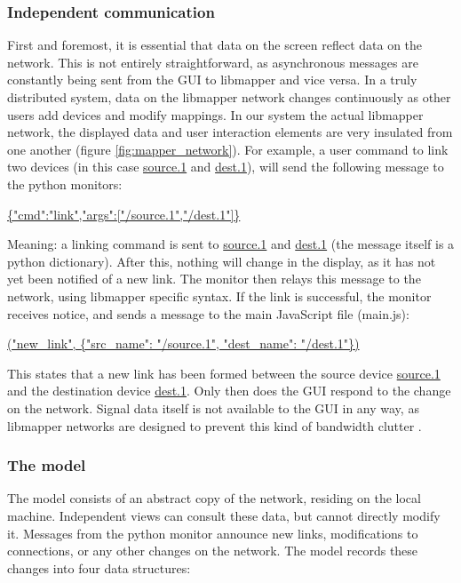 		\subsubsection{Independent communication}

First and foremost, it is essential that data on the screen reflect data on the network. This is not entirely straightforward, as asynchronous messages are constantly being sent from the GUI to libmapper and vice versa. In a truly distributed system, data on the libmapper network changes continuously as other users add devices and modify mappings. In our system the actual libmapper network, the displayed data and user interaction elements are very insulated from one another (figure \ref{fig:mapper_network}). For example, a user command to link two devices (in this case \url{source.1} and \url{dest.1}), will send the following message to the python monitors:

\url{ {"cmd":"link","args":["/source.1","/dest.1"]} }

Meaning: a linking command is sent to \url{source.1} and \url{dest.1} (the message itself is a python dictionary). After this, nothing will change in the display, as it has not yet been notified of a new link. The monitor then relays this message to the network, using libmapper specific syntax. If the link is successful, the monitor receives notice, and sends a message to the main JavaScript file (main.js):

\url{("new_link", {"src_name": "/source.1", "dest_name": "/dest.1"}) }

This states that a new link has been formed between the source device \url{source.1} and the destination device \url{dest.1}. Only then does the GUI respond to the change on the network. Signal data itself is not available to the GUI in any way, as libmapper networks are designed to prevent this kind of bandwidth clutter .

		\subsubsection{The model}

The model consists of an abstract copy of the network, residing on the local machine. Independent views can consult these data, but cannot directly modify it. Messages from the python monitor announce new links, modifications to connections, or any other changes on the network. The model records these changes into four data structures:

